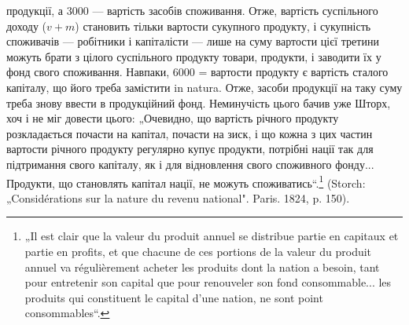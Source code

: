 \parcont{}  %
продукції, а 3000 — вартість засобів споживання. Отже, вартість суспільного
доходу ($v + m$) становить тільки  вартости сукупного продукту,
і сукупність споживачів — робітники і капіталісти — лише на суму вартости
цієї третини можуть брати з цілого суспільного продукту товари,
продукти, і заводити їх у фонд свого споживання. Навпаки, 6000 = 
вартости продукту є вартість сталого капіталу, що його треба замістити
in natura. Отже, засоби продукції на таку суму треба знову ввести в
продукційний фонд. Неминучість цього бачив уже Шторх, хоч і не міг
довести цього: „Очевидно, що вартість річного продукту розкладається
почасти на капітал, почасти на зиск, і що кожна з цих частин вартости річного
продукту регулярно купує продукти, потрібні нації так для підтримання
свого капіталу, як і для відновлення свого споживного фонду... Продукти,
що становлять капітал нації, не можуть споживатись“.\footnote*{
„Il est clair que la valeur du produit annuel se distribue partie en capitaux
et partie en profits, et que chacune de ces portions de la valeur du produit annuel
va régulièrement acheter les produits dont la nation a besoin, tant pour entretenir
son capital que pour renouveler son fond consommable... les produits qui constituent
le capital d’une nation, ne sont point consommables“.
} (Storch:
„Considérations sur la nature du revenu national". Paris. 1824, p. 150).

